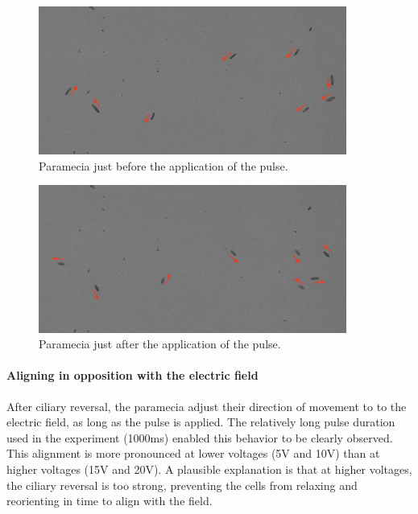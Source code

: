 \noindent
\begin{minipage}{0.49\textwidth}
\begin{figure}[H]
\centering 
\captionsetup{width=0.9\linewidth, justification=centering}
\includegraphics[width=0.9\textwidth]{Figures/before_pulse.png}
\caption{Paramecia just before the application of the pulse.}
\label{fig:before_pulse}
\end{figure}
\end{minipage}
\hfill
\begin{minipage}{0.49\textwidth}
\begin{figure}[H]
\centering 
\captionsetup{width=0.9\linewidth, justification=centering}
\includegraphics[width=0.9\textwidth]{Figures/after_pulse.png}
\caption{Paramecia just after the application of the pulse.}
\label{fig:after_pulse}
\end{figure}
\end{minipage}



\paragraph{Aligning in opposition with the electric field}

After ciliary reversal, the paramecia adjust their direction of movement to to the electric field, as long as the pulse is applied. The relatively long pulse duration used in the experiment (1000ms) enabled this behavior to be clearly observed. This alignment is more pronounced at lower voltages (5V and 10V) than at higher voltages (15V and 20V). A plausible explanation is that at higher voltages, the ciliary reversal is too strong, preventing the cells from relaxing and reorienting in time to align with the field.

